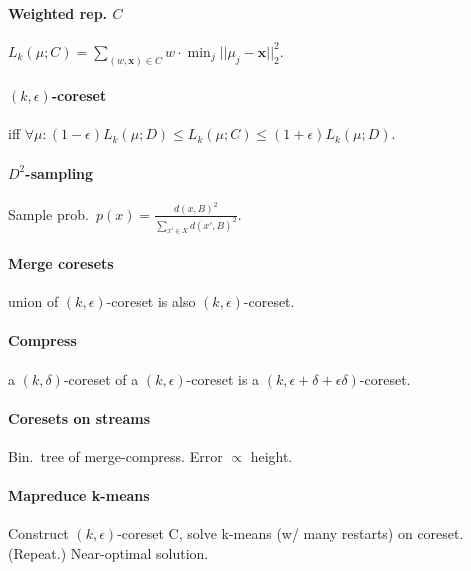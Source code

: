 \documentclass[10pt]{scrartcl}
\DeclareMathOperator{\argmin}{argmin}
\newcommand{\eps}{\epsilon}
\begin{document}
\begin{multicols}{3}
\paragraph{Weighted rep. $C$} $L_k(\mu;C) = \sum_{(w,\bm x)\in C}w\cdot\min_j||\mu_j - \bm x||_2^2$.

\paragraph{$(k,\eps)$-coreset} iff $\forall\mu: (1-\eps)L_k(\mu;D) \leq L_k(\mu;C) \leq (1+\eps)L_k(\mu;D)$.

\paragraph{$D^2$-sampling}
Sample prob.\ $p(x) = \frac{d(x,B)^2}{\sum_{x' \in X} d(x', B)^2}$.


\paragraph{Merge coresets} union of $(k,\eps)$-coreset is also $(k,\eps)$-coreset.

\paragraph{Compress} a $(k,\delta)$-coreset of a $(k,\eps)$-coreset is a $(k,\eps+\delta+\eps\delta)$-coreset.

\paragraph{Coresets on streams} Bin.\ tree of merge-compress. Error $\propto$ height.

\paragraph{Mapreduce k-means} Construct $(k,\eps)$-coreset C, solve k-means (w/ many restarts) on coreset. (Repeat.) Near-optimal solution.


\end{multicols}
\end{document}
